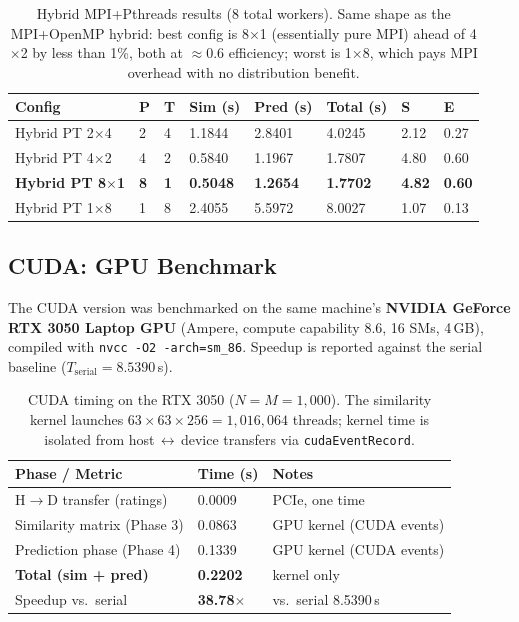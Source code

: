 \documentclass[11pt,a4paper]{article}
\newcommand{\code}[1]{\texttt{\small #1}}
\begin{document}
\begin{table}[H]
\centering
\begin{tabular}{L{2.6cm} C{0.7cm} C{0.7cm} R{1.4cm} R{1.5cm} R{1.5cm} R{1.0cm} R{1.0cm}}
\toprule
\textbf{Config} & \textbf{P} & \textbf{T} &
\textbf{Sim (s)} & \textbf{Pred (s)} & \textbf{Total (s)} &
\textbf{S} & \textbf{E} \\
\midrule
Hybrid PT 2$\times$4 & 2 & 4 & 1.1844 & 2.8401 & 4.0245 & 2.12 & 0.27 \\
Hybrid PT 4$\times$2 & 4 & 2 & 0.5840 & 1.1967 & 1.7807 & 4.80 & 0.60 \\
\textbf{Hybrid PT 8$\times$1} & \textbf{8} & \textbf{1} & \textbf{0.5048} & \textbf{1.2654} & \textbf{1.7702} & \textbf{4.82} & \textbf{0.60} \\
Hybrid PT 1$\times$8 & 1 & 8 & 2.4055 & 5.5972 & 8.0027 & 1.07 & 0.13 \\
\bottomrule
\end{tabular}
\caption{Hybrid MPI+Pthreads results (8 total workers). Same shape as the
MPI+OpenMP hybrid: best config is 8$\times$1 (essentially pure MPI) ahead of
4$\times$2 by less than 1\%, both at $\approx 0.6$ efficiency; worst is
1$\times$8, which pays MPI overhead with no distribution benefit.}
\label{tab:hybridptresults}
\end{table}

\FloatBarrier
\subsection{CUDA: GPU Benchmark}
\label{sec:cuda-results}

The CUDA version was benchmarked on the same machine's
\textbf{NVIDIA GeForce RTX 3050 Laptop GPU} (Ampere, compute capability 8.6,
16 SMs, 4\,GB), compiled with \code{nvcc -O2 -arch=sm\_86}. Speedup is reported
against the serial baseline ($T_{\text{serial}} = 8.5390$\,s).

\begin{table}[H]
\centering
\begin{tabular}{L{5cm} R{2.5cm} R{3cm}}
\toprule
\textbf{Phase / Metric} & \textbf{Time (s)} & \textbf{Notes} \\
\midrule
H$\rightarrow$D transfer (ratings) & 0.0009 & PCIe, one time \\
Similarity matrix (Phase 3) & 0.0863 & GPU kernel (CUDA events) \\
Prediction phase (Phase 4)  & 0.1339 & GPU kernel (CUDA events) \\
\textbf{Total (sim + pred)}  & \textbf{0.2202} & kernel only \\
\midrule
Speedup vs.\ serial          & \textbf{38.78$\times$} & vs.\ serial 8.5390\,s \\
\bottomrule
\end{tabular}
\caption{CUDA timing on the RTX 3050 ($N=M=1{,}000$). The similarity kernel
launches $63\times63\times256 = 1{,}016{,}064$ threads; kernel time is isolated
from host\,$\leftrightarrow$\,device transfers via \code{cudaEventRecord}.}
\end{table}
\end{document}
